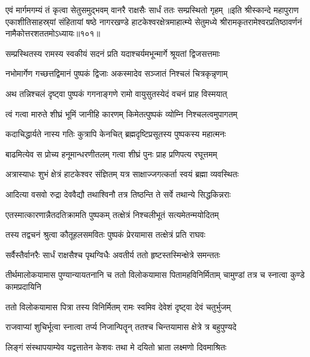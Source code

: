 \twolineshloka
{एवं मार्गमगम्यं तं कृत्वा सेतुसमुद्भवम्}
{वानरै राक्षसैः सार्धं ततः सम्प्रस्थितो गृहम्}%
॥इति श्रीस्कान्दे महापुराण एकाशीतिसाहस्र्यां संहितायां षष्ठे नागरखण्डे हाटकेश्वरक्षेत्रमाहात्म्ये सेतुमध्ये श्रीरामकृतरामेश्वरप्रतिष्ठावर्णनं नामैकोत्तरशततमोऽध्यायः॥१०१॥


\twolineshloka
{सम्प्रस्थितस्य रामस्य स्वकीयं सदनं प्रति}
{यदाश्चर्यमभून्मार्गे श्रूयतां द्विजसत्तमाः}%

\twolineshloka
{नभोमार्गेण गच्छत्तद्विमानं पुष्पकं द्विजाः}
{अकस्मादेव सञ्जातं निश्चलं चित्रकृन्नृणाम्}%

\twolineshloka
{अथ तन्निश्चलं दृष्ट्वा पुष्पकं गगनाङ्गणे}
{रामो वायुसुतस्येदं वचनं प्राह विस्मयात्}%

\twolineshloka
{त्वं गत्वा मारुते शीघ्रं भूमिं जानीहि कारणम्}
{किमेतत्पुष्पकं व्योम्नि निश्चलत्वमुपागतम्}%

\twolineshloka
{कदाचिद्धार्यते नास्य गतिः कुत्रापि केनचित्}
{ब्रह्मदृष्टिप्रसूतस्य पुष्पकस्य महात्मनः}%

\twolineshloka
{बाढमित्येव स प्रोच्य हनूमान्धरणीतलम्}
{गत्वा शीघ्रं पुनः प्राह प्रणिपत्य रघूत्तमम्}%

\twolineshloka
{अत्रास्याधः शुभं क्षेत्रं हाटकेश्वर संज्ञितम्}
{यत्र साक्षाज्जगत्कर्ता स्वयं ब्रह्मा व्यवस्थितः}%

\twolineshloka
{आदित्या वसवो रुद्रा देववैद्यौ तथाश्विनौ}
{तत्र तिष्ठन्ति ते सर्वे तथान्ये सिद्धकिन्नराः}%

\twolineshloka
{एतस्मात्कारणान्नैतदतिक्रामति पुष्पकम्}
{तत्क्षेत्रं निश्चलीभूतं सत्यमेतन्मयोदितम्}%


\twolineshloka
{तस्य तद्वचनं श्रुत्वा कौतूहलसमवितः} 
{पुष्पकं प्रेरयामास तत्क्षेत्रं प्रति राघवः} 

\twolineshloka
{सर्वैस्तैर्वानरैः सार्धं राक्षसैश्च पृथग्विधैः}
{अवतीर्य ततो हृष्टस्तस्मिन्क्षेत्रे समन्ततः}%

\threelineshloka
{तीर्थमालोकयामास पुण्यान्यायतनानि च}
{ततो विलोकयामास पितामहविनिर्मिताम्}
{चामुण्डां तत्र च स्नात्वा कुण्डे कामप्रदायिनि}%

\twolineshloka
{ततो विलोकयामास पित्रा तस्य विनिर्मितम्}
{रामः स्वमिव देवेशं दृष्ट्वा देवं चतुर्भुजम्}%

\twolineshloka
{राजवाप्यां शुचिर्भूत्वा स्नात्वा तर्प्य निजान्पितॄन्}
{ततश्च चिन्तयामास क्षेत्रे त्र बहुपुण्यदे}%

\twolineshloka
{लिङ्गं संस्थापयाम्येव यद्वत्तातेन केशवः}
{तथा मे दयितो भ्राता लक्ष्मणो दिवमाश्रितः}%

